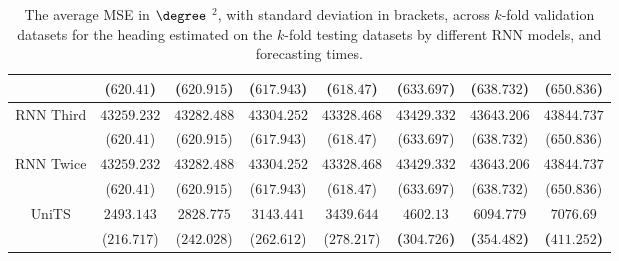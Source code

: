 \begin{table}[!ht]
{\begin{tabular}{|c|c|c|c|c|c|c|c|}
			 & ($620.41$) & ($620.915$) & ($617.943$) & ($618.47$) & ($633.697$) & ($638.732$) & ($650.836$) \\ \hline
			\multirow{2}{*}{RNN Third} & $43259.232$ & $43282.488$ & $43304.252$ & $43328.468$ & $43429.332$ & $43643.206$ & $43844.737$ \\
			 & ($620.41$) & ($620.915$) & ($617.943$) & ($618.47$) & ($633.697$) & ($638.732$) & ($650.836$) \\ \hline
			\multirow{2}{*}{RNN Twice} & $43259.232$ & $43282.488$ & $43304.252$ & $43328.468$ & $43429.332$ & $43643.206$ & $43844.737$ \\
			 & ($620.41$) & ($620.915$) & ($617.943$) & ($618.47$) & ($633.697$) & ($638.732$) & ($650.836$) \\ \hline
			\multirow{2}{*}{UniTS} & $2493.143$ & $2828.775$ & $3143.441$ & $3439.644$ & $\mathbf{4602.13}$ & $\mathbf{6094.779}$ & $\mathbf{7076.69}$ \\
			 & ($216.717$) & ($242.028$) & ($262.612$) & ($278.217$) & \textbf{(}$\mathbf{304.726}$\textbf{)} & \textbf{(}$\mathbf{354.482}$\textbf{)} & \textbf{(}$\mathbf{411.252}$\textbf{)} \\ \hline
		\end{tabular}
	}
	\caption{The average MSE in $\degree$ $^{2}$, with standard deviation in brackets, across $k$-fold validation datasets for the heading estimated on the $k$-fold testing datasets by different RNN models, and forecasting times.}
	\label{tab:all_direction_MSE}
\end{table}

